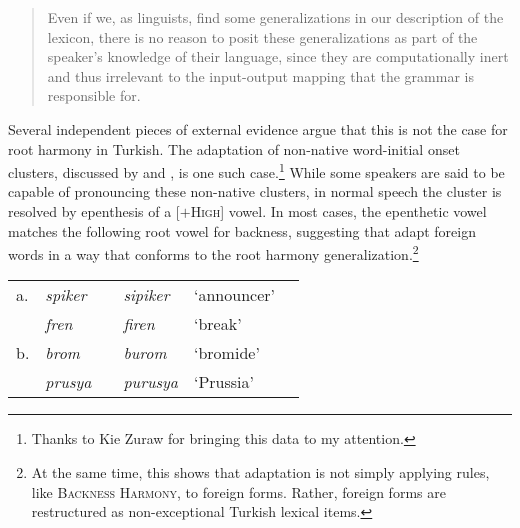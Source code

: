 \begin{quote}
Even if we, as linguists, find some generalizations in our description of the lexicon, there is no reason to posit these generalizations as part of the speaker's knowledge of their language, since they are computationally inert and thus irrelevant to the input-output mapping that the grammar is responsible for. \citep[][18]{PE}
\end{quote}

Several independent pieces of external evidence argue that this is not the case for root harmony in Turkish. 
The adaptation of non-native word-initial onset clusters, discussed by \citet{Clements1982} and \citet{Kaun1999}, is one such case.\footnote{Thanks to Kie Zuraw for bringing this data to my attention.} While some speakers are said to be capable of pronouncing these non-native clusters, in normal speech the cluster is resolved by epenthesis of a [$+$\textsc{High}] vowel. In most cases, the epenthetic vowel matches the following root vowel for backness, suggesting that adapt foreign words in a way that conforms to the root harmony generalization.\footnote{At the same time, this shows that adaptation is not simply applying rules, like \textsc{Backness Harmony}, to foreign forms. Rather, foreign forms are restructured as non-exceptional Turkish lexical items.}


\begin{example} 
\begin{tabular}{l l l l l l}
a. & \emph{spiker}  & \alt{} & \emph{sipiker}  & `announcer' \\
   & \emph{fren}    & \alt{} & \emph{firen}    & `break'     \\
b. & \emph{brom}    & \alt{} & \emph{burom}    & `bromide'   \\
   & \emph{prusya}  & \alt{} & \emph{purusya}  & `Prussia'   \\
\end{tabular}
\end{example}

